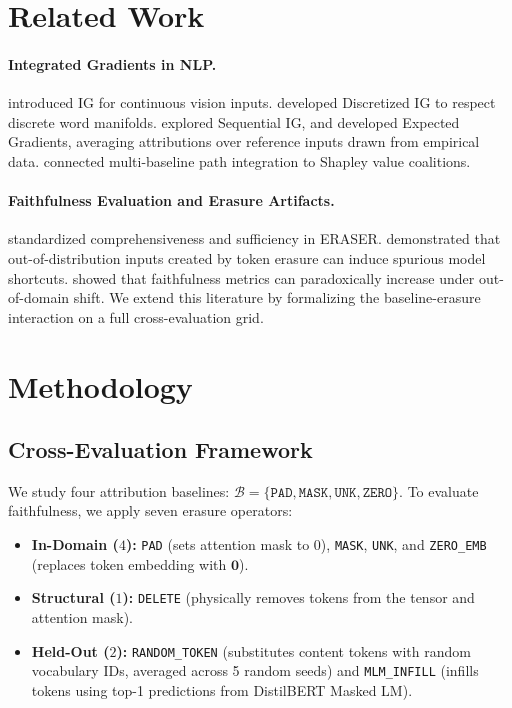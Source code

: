 \documentclass[11pt]{article}
\begin{document}
\section{Related Work}
\label{sec:related}

\paragraph{Integrated Gradients in NLP.}
\citet{sundararajan2017axiomatic} introduced IG for continuous vision inputs. \citet{sanyal2021discretized} developed Discretized IG to respect discrete word manifolds. \citet{enguehard2023sequential} explored Sequential IG, and \citet{erion2021improving} developed Expected Gradients, averaging attributions over reference inputs drawn from empirical data. \citet{liu2023shapley} connected multi-baseline path integration to Shapley value coalitions.

\paragraph{Faithfulness Evaluation and Erasure Artifacts.}
\citet{deyoung2020eraser} standardized comprehensiveness and sufficiency in ERASER. \citet{bastings2022shortcuts} demonstrated that out-of-distribution inputs created by token erasure can induce spurious model shortcuts. \citet{chrysostomou2022empirical} showed that faithfulness metrics can paradoxically increase under out-of-domain shift. We extend this literature by formalizing the baseline-erasure interaction on a full cross-evaluation grid.

\section{Methodology}
\label{sec:method}

\subsection{Cross-Evaluation Framework}
We study four attribution baselines: $\mathcal{B} = \{\texttt{PAD}, \texttt{MASK}, \texttt{UNK}, \texttt{ZERO}\}$.
To evaluate faithfulness, we apply seven erasure operators:
\begin{itemize}
    \item \textbf{In-Domain ($4$):} \texttt{PAD} (sets attention mask to 0), \texttt{MASK}, \texttt{UNK}, and \texttt{ZERO\_EMB} (replaces token embedding with $\mathbf{0}$).
    \item \textbf{Structural ($1$):} \texttt{DELETE} (physically removes tokens from the tensor and attention mask).
    \item \textbf{Held-Out ($2$):} \texttt{RANDOM\_TOKEN} (substitutes content tokens with random vocabulary IDs, averaged across 5 random seeds) and \texttt{MLM\_INFILL} (infills tokens using top-1 predictions from DistilBERT Masked LM).
\end{itemize}
\end{document}
